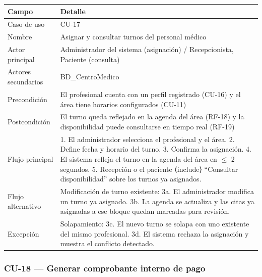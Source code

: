 \documentclass[11pt,a4paper]{article}
\begin{document}
	\begin{longtable}{p{} p{} }
		
		
		\toprule
		\textbf{Campo} &
		\textbf{Detalle}  \\
		\midrule
		\endhead
		
		Caso de uso & CU-17 \\
		Nombre & Asignar y consultar turnos del personal médico \\
		Actor principal & Administrador del sistema (asignación) / Recepcionista, Paciente (consulta) \\
		Actores secundarios & BD\_CentroMedico \\
		Precondición & El profesional cuenta con un perfil registrado (CU-16) y el área tiene horarios configurados (CU-11) \\
		Postcondición & El turno queda reflejado en la agenda del área (RF-18) y la disponibilidad puede consultarse en tiempo real (RF-19) \\
		Flujo principal & 1. El administrador selecciona el profesional y el área. 2. Define fecha y horario del turno. 3. Confirma la asignación. 4. El sistema refleja el turno en la agenda del área en \(\leq\) 2 segundos. 5. Recepción o el paciente ⟨include⟩ ``Consultar disponibilidad'' sobre los turnos ya asignados. \\
		Flujo alternativo & Modificación de turno existente: 3a. El administrador modifica un turno ya asignado. 3b. La agenda se actualiza y las citas ya asignadas a ese bloque quedan marcadas para revisión. \\
		Excepción & Solapamiento: 3c. El nuevo turno se solapa con uno existente del mismo profesional. 3d. El sistema rechaza la asignación y muestra el conflicto detectado. \\
		\bottomrule
	\end{longtable}
	
	\subsubsection{CU-18 --- Generar comprobante interno de pago}
	
\end{document}
